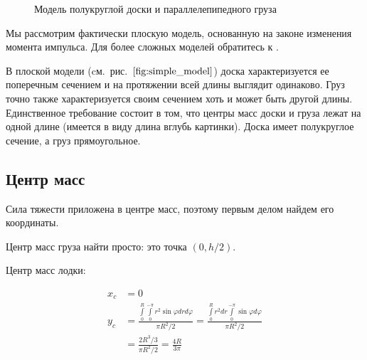 \documentclass[12pt,a4paper]{article}
\begin{document}
\begin{figure}
	\centering
	\caption{Модель полукруглой доски и параллелепипедного груза}	
	\label{fig:simple_model}
\end{figure}

Мы рассмотрим фактически плоскую модель, основанную на законе изменения момента импульса. Для более сложных моделей обратитесь к \cite{fossen_marine_control}.

В плоской модели (cм.~рис.~$\ref{fig:simple_model}$) доска характеризуется ее поперечным сечением и на протяжении всей длины выглядит одинаково. Груз точно также характеризуется своим сечением хоть и может быть другой длины. Единственное требование состоит в том, что центры масс доски и груза лежат на одной длине (имеется в виду длина вглубь картинки). Доска имеет полукруглое сечение, а груз прямоугольное.

\subsection{Центр масс}

Сила тяжести приложена в центре масс, поэтому первым делом найдем его координаты.

Центр масс груза найти просто: это точка $(0, h/2)$.

Центр масс лодки:

\begin{align*}
	x_c & = 0 \\
	y_c & = \frac{\int\limits_0^R \int\limits_0^{-\pi} r^2 \sin \varphi dr d\varphi}{\pi R^2/2} 
		= \frac{\int\limits_0^R r^2 dr \int\limits_0^{-\pi}  \sin \varphi d\varphi}{\pi R^2/2} \\
		& = \frac{2R^3/3}{\pi R^2/2} = \frac{4R}{3\pi} 
\end{align*}
\end{document}
